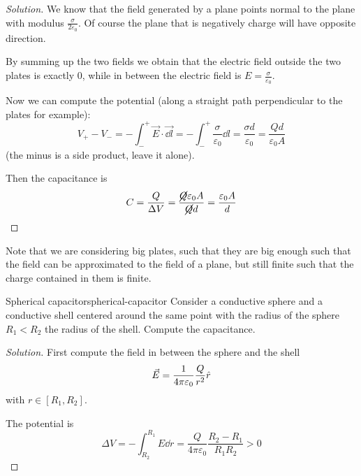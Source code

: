 \documentclass[12pt]{extarticle}
\begin{document}
\begin{proof}[Solution]
    We know that the field generated by a plane points normal to the plane with modulus $\frac{\sigma}{2\varepsilon_0}$.
    Of course the plane that is negatively charge will have opposite direction.

    By summing up the two fields we obtain that the electric field outside the two plates is exactly $0$, while in between the electric field is $E = \frac{\sigma}{\varepsilon_0}$.

    Now we can compute the potential (along a straight path perpendicular to the plates for example):
    \begin{equation}
        V_+ - V_- = - \int_-^+ \vec E \cdot \vec{\dd l} = - \int_-^+ \frac{\sigma}{\varepsilon_0} \dd{l} = \frac{\sigma d}{\varepsilon_0} = \frac{Q d}{\varepsilon_0 A}
    \end{equation}
    (the minus is a side product, leave it alone).

    Then the capacitance is
    \begin{equation}
        C = \frac{Q}{\Delta V} = \frac{\cancel{Q} \varepsilon_0 A}{\cancel{Q} d} = \frac{\varepsilon_0 A}{d}
    \end{equation}
\end{proof}

Note that we are considering big plates, such that they are big enough such that the field can be approximated to the field of a plane, but still finite such that the charge contained in them is finite.

\begin{example}{Spherical capacitor}{spherical-capacitor}
    Consider a conductive sphere and a conductive shell centered around the same point with the radius of the sphere $R_1 < R_2$ the radius of the shell.
    Compute the capacitance.
\end{example}

\begin{proof}[Solution]
    First compute the field in between the sphere and the shell
    \begin{equation}
        \vec E = \frac{1}{4 \pi \varepsilon_0} \frac{Q}{r^2} \hat r
    \end{equation}
    with $r \in [R_1, R_2]$.

    The potential is
    \begin{equation}
        \Delta V = - \int_{R_2}^{R_1} E \dd{r} = \frac{Q}{4 \pi \varepsilon_0} \frac{R_2 - R_1}{R_1 R_2} > 0
    \end{equation}
\end{proof}
\end{document}
